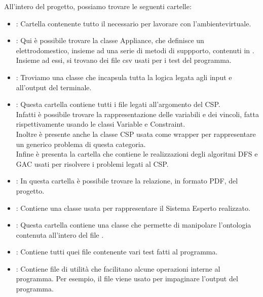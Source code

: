 \documentclass[12pt, letterpaper]{article}
\begin{document}
All'intero del progetto, possiamo trovare le seguenti cartelle:
\begin{itemize}
      \item {}: Cartella contenente tutto il necessario per lavorare con
            l'ambientevirtuale.
      \item {}: Qui è possibile trovare la classe Appliance, che definisce
            un elettrodomestico, insieme ad una serie di metodi di suppporto,
            contenuti in . Insieme ad essi, si trovano dei file csv
            usati per i test del programma.

      \item {}: Troviamo una classe che incapsula tutta la logica legata agli input
            e all'output del terminale.

      \item {}: Questa cartella contiene tutti i file legati all'argomento del
            CSP. \\
            Infatti è possibile trovare la rappresentazione delle variabili e dei vincoli, fatta
            rispettivamente usando le classi Variable e Constraint. \\
            Inoltre è presente anche la classe CSP usata come wrapper per rappresentare un generico
            problema di questa categoria. \\
            Infine è presenta la cartella  che contiene le realizzazioni degli
            algoritmi DFS e GAC usati per risolvere i problemi legati al CSP.

      \item {}: In questa cartella è possibile trovare la relazione, in formato PDF, del
            progetto.

      \item {}: Contiene una classe usata per rappresentare il Sistema Esperto
            realizzato.

      \item {}: Questa cartella contiene una classe che permette di manipolare
            l'ontologia contenuta all'intero del file .

      \item {}: Contiene tutti quei file contenente vari test fatti al programma.

      \item {}: Contiene file di utilità che facilitano alcune operazioni interne al programma.
            Per esempio, il file  viene usato per impaginare l'output del programma.
\end{itemize}
\end{document}
